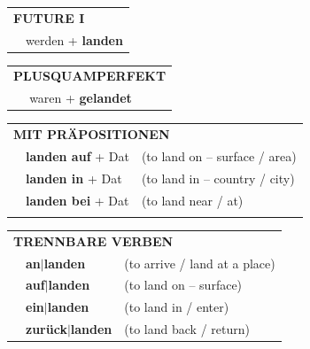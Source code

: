 \documentclass[10pt,a4paper]{revtex4-2}
\begin{document}
\begin{verbbox}
\begin{tabular}{rl}
    \multicolumn{2}{l}{\textbf{FUTURE I} }\\
   & werden + \textbf{landen}\\
 
  \end{tabular}
\hfill
   \begin{tabular}{rl}
      \multicolumn{2}{l}{\textbf{PLUSQUAMPERFEKT}}\\
   & waren + \textbf{gelandet}\\
  \end{tabular}

   \vspace{10pt}

   \begin{tabular}{lll}
      \multicolumn{3}{l}{\textbf{MIT PRÄPOSITIONEN}}\\
& \textbf{landen auf} + Dat & (to land on – surface / area)\\
& \textbf{landen in} + Dat & (to land in – country / city)\\
& \textbf{landen bei} + Dat & (to land near / at)\\
\vspace{10pt}
   \end{tabular}
  \hfill
   \begin{tabular}{lll}
      \multicolumn{3}{l}{\textbf{TRENNBARE VERBEN}}\\
 & \textbf{an$|$landen} & (to arrive / land at a place)\\
 & \textbf{auf$|$landen} & (to land on – surface)\\
 & \textbf{ein$|$landen} & (to land in / enter)\\
 & \textbf{zurück$|$landen} & (to land back / return)\\
  \end{tabular}

\vspace{-5pt}

\end{verbbox}
\end{document}
